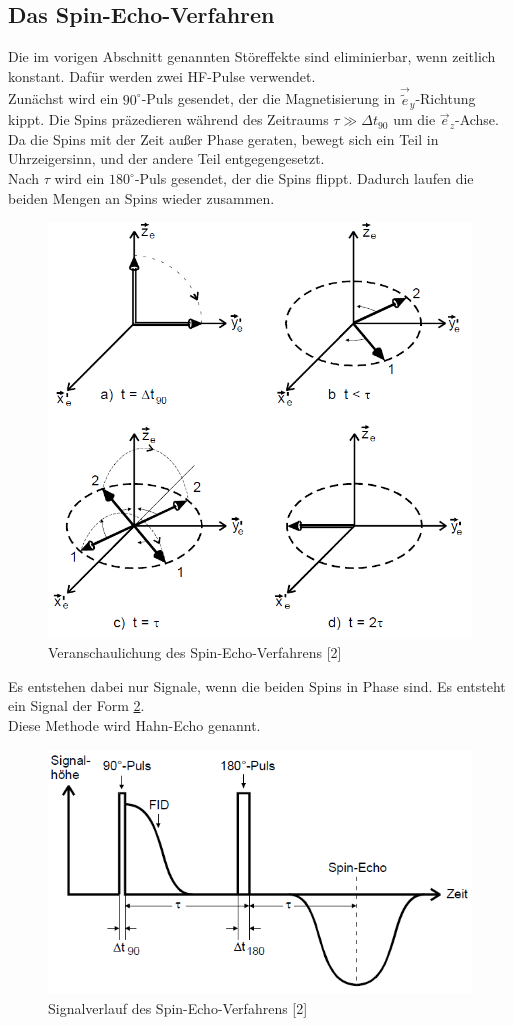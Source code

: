 \documentclass[]{scrartcl}
\begin{document}
\subsection{Das Spin-Echo-Verfahren}
Die im vorigen Abschnitt genannten Störeffekte sind eliminierbar, wenn zeitlich konstant. Dafür werden zwei HF-Pulse verwendet.\\
Zunächst wird ein $90^\circ$-Puls gesendet, der die Magnetisierung in $\vec{\tilde{e}}_y$-Richtung kippt. Die Spins präzedieren während des Zeitraums $\tau \gg \Delta t_{90}$ um die $\vec{e}_z$-Achse.\\
Da die Spins mit der Zeit außer Phase geraten, bewegt sich ein Teil in Uhrzeigersinn, und der andere Teil entgegengesetzt.\\
Nach $\tau$ wird ein $180^\circ$-Puls gesendet, der die Spins flippt. Dadurch laufen die beiden Mengen an Spins wieder zusammen.
\begin{figure}[H]
\centering
\includegraphics[width=12cm]{images/spin_echo.png}
\caption{Veranschaulichung des Spin-Echo-Verfahrens [2]}
\label{fig::spin_echo}
\end{figure}
Es entstehen dabei nur Signale, wenn die beiden Spins in Phase sind. Es entsteht ein Signal der Form \ref{fig::hahn_echo_verlauf}.\\
Diese Methode wird Hahn-Echo genannt.
\begin{figure}[H]
\centering
\includegraphics[width=12cm]{images/hahn_echo.png}
\caption{Signalverlauf des Spin-Echo-Verfahrens [2]}
\label{fig::hahn_echo_verlauf}
\end{figure}
\end{document}
